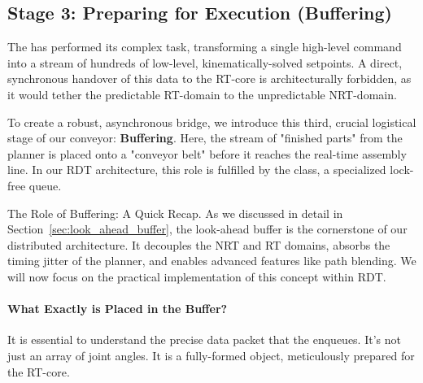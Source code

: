 


\subsection{Stage 3: Preparing for Execution (Buffering)}
\label{subsec:stage3_buffering_rdt_expanded}

The  has performed its complex task, transforming a single high-level command into a stream of hundreds of low-level, kinematically-solved setpoints. A direct, synchronous handover of this data to the RT-core is architecturally forbidden, as it would tether the predictable RT-domain to the unpredictable NRT-domain.

To create a robust, asynchronous bridge, we introduce this third, crucial logistical stage of our conveyor: \textbf{Buffering}. Here, the stream of "finished parts" from the planner is placed onto a "conveyor belt" before it reaches the real-time assembly line. In our RDT architecture, this role is fulfilled by the \textbf{} class, a specialized lock-free queue.

\begin{navigationbox}{The Role of Buffering: A Quick Recap.}
    As we discussed in detail in Section~\ref{sec:look_ahead_buffer}, the look-ahead buffer is the cornerstone of our distributed architecture. It decouples the NRT and RT domains, absorbs the timing jitter of the planner, and enables advanced features like path blending. We will now focus on the practical implementation of this concept within RDT.
\end{navigationbox}

\paragraph{What Exactly is Placed in the Buffer?}
It is essential to understand the precise data packet that the  enqueues. It's not just an array of joint angles. It is a fully-formed  object, meticulously prepared for the RT-core.

